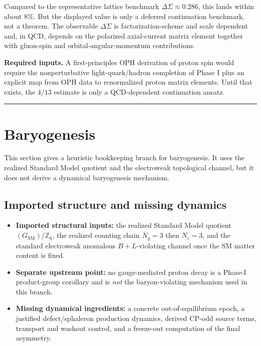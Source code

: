 Compared to the representative lattice benchmark \(\Delta\Sigma \approx 0.286\), this lands within about \(8\%\). But the displayed value is only a deferred continuation benchmark, not a theorem. The observable \(\Delta\Sigma\) is factorization-scheme and scale dependent and, in QCD, depends on the polarized axial-current matrix element together with gluon-spin and orbital-angular-momentum contributions.

\textbf{Required inputs.} A first-principles OPH derivation of proton spin would require the nonperturbative light-quark/hadron completion of Phase I plus an explicit map from OPH data to renormalized proton matrix elements. Until that exists, the \(4/13\) estimate is only a QCD-dependent continuation ansatz.

\begin{center}\rule{0.5\linewidth}{0.5pt}\end{center}

\section{Baryogenesis}\label{11-baryogenesis}

This section gives a heuristic bookkeeping branch for baryogenesis. It uses the realized Standard Model quotient and the electroweak topological channel, but it does not derive a dynamical baryogenesis mechanism.

\subsection{Imported structure and missing dynamics}

\begin{itemize}
\tightlist
\item
 \textbf{Imported structural inputs:} the realized Standard Model quotient \((G_{\text{SM}})/\mathbb{Z}_6\), the realized counting chain \(N_g = 3\) then \(N_c = 3\), and the standard electroweak anomalous \(B+L\)-violating channel once the SM matter content is fixed.
\item
 \textbf{Separate upstream point:} no gauge-mediated proton decay is a Phase-I product-group corollary and is \emph{not} the baryon-violating mechanism used in this branch.
\item
 \textbf{Missing dynamical ingredients:} a concrete out-of-equilibrium epoch, a justified defect/sphaleron production dynamics, derived CP-odd source terms, transport and washout control, and a freeze-out computation of the final asymmetry.
\end{itemize}

